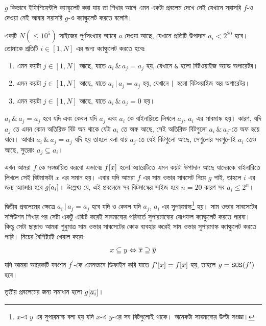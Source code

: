 $g$ কিভাবে ইফিশিয়েন্টলি ক্যাল্কুলেট করা যায় তা শিখার আগে এমন একটা প্রবলেম
দেখে নেই যেখানে সরাসরি $f$-ও দেওয়া নেই আবার সরাসরি $g$-ও ক্যাল্কুলেট করতে
বলেনি। 

\begin{example}
  একটি $N (\le 10^5)$ সাইজের পুর্ণসংখ্যার অ্যারে $a$ দেওয়া আছে, যেখানে
  প্রতিটি উপাদান $a_i < 2^{20}$ হবে। তোমাকে প্রতিটি $i \in [1, N]$ এর জন্য
  ক্যাল্কুলেট করতে হবেঃ
  \begin{enumerate}
    \item এমন কয়টা $j \in [1, N]$ আছে, যাতে $a_i \, \texttt{\&} \, a_j = a_j$
    হয়, যেখানে \texttt{\&} হলো বিটওয়াইজ অ্যান্ড অপারেটর।
    \item এমন কয়টা $j \in [1, N]$ আছে, যাতে $a_i \, \texttt{|} \, a_j = a_j$
    হয়, যেখানে \texttt{|} হলো বিটওয়াইজ অর অপারেটর।
    \item এমন কয়টা $j \in [1, N]$ আছে, যাতে $a_i \, \texttt{\&} \, a_j = 0$
    হয়।
  \end{enumerate}
\end{example}
\begin{solution}
  $a_i \, \texttt{\&} \, a_j = a_j$ হবে যদি এবং কেবল যদি $a_j$ এবং $a_i$ কে
  বাইনারিতে লিখলে $a_j$, $a_i$ এর সাবমাস্ক হয়। কারণ, যদি $a_j$ তে এমন কোন
  অতিরিক্ত বিট অন থাকে যেটা $a_i$ তে অফ আছে, সেই অতিরিক্ত বিটগুলো $a_i \,
  \texttt{\&} \, a_j$-তে অফ হয়ে যাবে। আবার $a_i \, \texttt{\&} \, a_j =
  a_j$ যদি হয় তাহলে বলা যায় $a_j$-তে যেই বিটগুলো আছে, সেগুলোর সবগুলোই $a_i$
  তেও আছে, সুতরাং $a_j \subseteq a_i$।
  
  এখন আমরা $f$ কে সংজ্ঞায়িত করবো
  এভাবেঃ $f[x]$ হলো অ্যারেটিতে এমন কয়টা উপাদান আছে যাদেরকে বাইনারিতে
  লিখলে সেই বিটমাস্কটা $x$ এর সমান হয়। এবার যদি আমরা $f$ এর সাম ওভার সাবসেট
  নিয়ে $g$ পাই, তাহলে $i$ এর জন্য অ্যান্সার হবে $g[a_i]$। উল্লেখ্য যে, এই
  প্রবলেমে সব বিটমাস্কের সাইজ হবে $n = 20$ কারণ সব $a_i \le 2^n$।

  দ্বিতীয় প্রবলেমের ক্ষেত্রে $a_i \, \texttt{|} \, a_j = a_j$ হবে যদি ও কেবল
  যদি $a_j$, $a_i$ এর সুপারমাস্ক\footnote{$x$-এ $y$ এর সুপারমাস্ক বলা হয় যদি
  $x$-এ $y$-এর সব বিটগুলোই থাকে। অনেকটা সাবমাস্কের উল্টা সংজ্ঞা।} হয়। সাম
  ওভার সাবসেটের সলিউশন শিখার পর সেটা একটু এডিট করেই সাবমাস্কের পরিবর্তে
  সুপারমাস্কের যোগফল ক্যাল্কুলেট করতে পারবা। কিন্তু সেটা ছাড়াও আমরা শুধুমাত্র
  সাম ওভার সাবসেটের কোড ব্যবহার করেই সাম ওভার সুপারমাস্ক ক্যাল্কুলেট করতে
  পারি। নিচের বৈশিষ্ট্যটি খেয়াল করো:
  \[
    x \subseteq y \Leftrightarrow \overline{x} \supseteq \overline{y}
  \]
  যদি আমরা আরেকটি ফাংশন $f^\prime$-কে এমনভাবে ডিফাইন করি যাতে
  $f^\prime[x] = f[\overline{x}]$ হয়, তাহলে $g = \texttt{SOS}(f^\prime)$ হবে।

  তৃতীয় প্রবলেমের জন্য সমাধান হলো $g[\overline{a_i}]$।
\end{solution}

